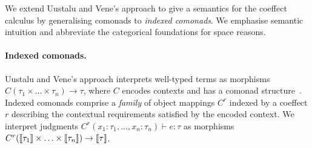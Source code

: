 We extend Uustalu and Vene's approach to give a semantics for
the coeffect calculus by generalising comonads to
\emph{indexed comonads}. We emphasise semantic intuition and
abbreviate the categorical foundations for space reasons.

\vspace{-1em}
\paragraph{Indexed comonads.}

Uustalu and Vene's approach interprets well-typed terms 
as morphisms $C (\tau_1 \times \ldots
\times \tau_n) \rightarrow \tau$, where $C$ encodes contexts
and has a comonad structure~\cite{comonads-notions}.
Indexed comonads comprise a \emph{family} of object mappings 
$C^r$ indexed by a coeffect $r$ describing the contextual requirements satisfied by
the encoded context. We interpret judgments $C^r (x_1 : \tau_1, \ldots, x_n : \tau_n) \vdash e : \tau$ as
morphisms $C^r (\llbracket \tau_1 \rrbracket \times \ldots \times \llbracket \tau_n \rrbracket) \rightarrow \llbracket \tau \rrbracket$.

